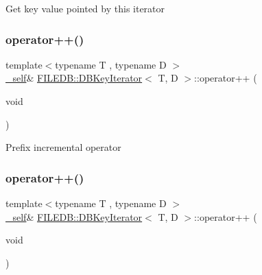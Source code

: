 Get key value pointed by this iterator \mbox{\label{classFILEDB_1_1DBKeyIterator_a7816155cac741f3f82dafa73028f4307}} 
\subsubsection{\texorpdfstring{operator++()}{operator++()}\hspace{0.1cm}{\footnotesize\ttfamily [1/6]}}
{\footnotesize\ttfamily template$<$typename T , typename D $>$ \\
\mbox{\hyperlink{classFILEDB_1_1DBKeyIterator_aaf7773c7a848ec6e04bc738dd794ace1}{\+\_\+self}}\& \mbox{\hyperlink{classFILEDB_1_1DBKeyIterator}{F\+I\+L\+E\+D\+B\+::\+D\+B\+Key\+Iterator}}$<$ T, D $>$\+::operator++ (\begin{DoxyParamCaption}\item[{void}]{ }\end{DoxyParamCaption})\hspace{0.3cm}{\ttfamily [inline]}}

Prefix incremental operator \mbox{\label{classFILEDB_1_1DBKeyIterator_a7816155cac741f3f82dafa73028f4307}} 
\subsubsection{\texorpdfstring{operator++()}{operator++()}\hspace{0.1cm}{\footnotesize\ttfamily [2/6]}}
{\footnotesize\ttfamily template$<$typename T , typename D $>$ \\
\mbox{\hyperlink{classFILEDB_1_1DBKeyIterator_aaf7773c7a848ec6e04bc738dd794ace1}{\+\_\+self}}\& \mbox{\hyperlink{classFILEDB_1_1DBKeyIterator}{F\+I\+L\+E\+D\+B\+::\+D\+B\+Key\+Iterator}}$<$ T, D $>$\+::operator++ (\begin{DoxyParamCaption}\item[{void}]{ }\end{DoxyParamCaption})\hspace{0.3cm}{\ttfamily [inline]}}

